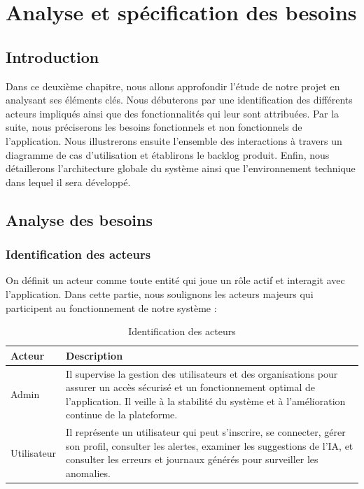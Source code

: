 \chapter{Analyse et spécification des besoins}

\section{Introduction} 
Dans ce deuxième chapitre, nous allons approfondir l’étude de notre projet en analysant ses éléments clés. Nous débuterons par une identification des différents acteurs impliqués ainsi que des fonctionnalités qui leur sont attribuées. Par la suite, nous préciserons les besoins fonctionnels et non fonctionnels de l’application. Nous illustrerons ensuite l’ensemble des interactions à travers un diagramme de cas d’utilisation et établirons le backlog produit. Enfin, nous détaillerons l’architecture globale du système ainsi que l’environnement technique dans lequel il sera développé.

\section{Analyse des besoins}

\subsection{Identification des acteurs}
On définit un acteur comme toute entité qui joue un rôle actif et interagit avec l’application. Dans cette partie, nous soulignons les acteurs majeurs qui participent au fonctionnement de notre système :

\begin{table}[H]
    \centering
    \renewcommand{\arraystretch}{1.3}
    \begin{tabular}{|p{3cm}|p{10cm}|}
        \hline
        \textbf{Acteur} & \textbf{Description} \\
        \hline
        Admin & Il supervise la gestion des utilisateurs et des organisations pour assurer un accès sécurisé et un fonctionnement optimal de l'application. Il veille à la stabilité du système et à l'amélioration continue de la plateforme. \\
        \hline
        Utilisateur & Il représente un utilisateur qui peut s'inscrire, se connecter, gérer son profil, consulter les alertes, examiner les suggestions de l'IA, et consulter les erreurs et journaux générés pour surveiller les anomalies. \\
        \hline
    \end{tabular}
    \captionsetup{justification=centering}
    \caption{Identification des acteurs}
    \label{tab:actors}
\end{table}


